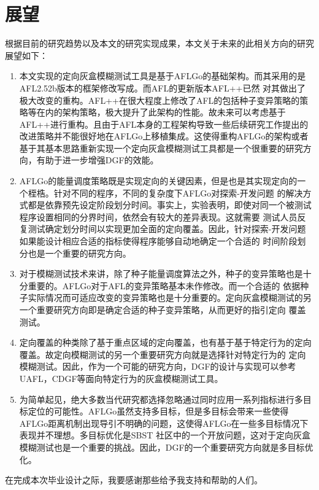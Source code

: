 \documentclass[bachelor]{njupthesis}
\begin{document}
\section{展望}
根据目前的研究趋势以及本文的研究实现成果，本文关于未来的此相关方向的研究展望如下：
\begin{enumerate}[label=(\arabic*),leftmargin=48pt]
	\item 本文实现的定向灰盒模糊测试工具是基于AFLGo的基础架构。而其采用的是AFL2.52b版本的框架修改写成。而AFL的更新版本AFL++已然
	对其做出了极大改变的重构。AFL++在很大程度上修改了AFL的包括种子变异策略的策略等在内的架构策略，极大提升了此架构的性能。故未来可以考虑基于
	AFL++进行重构。且由于AFL本身的工程架构导致一些后续研究工作提出的改进策略并不能很好地在AFLGo上移植集成。这使得重构AFLGo的架构或者
	基于其基本思路重新实现一个定向灰盒模糊测试工具都是一个很重要的研究方向，有助于进一步增强DGF的效能。
	\item AFLGo的能量调度策略既是实现定向的关键因素，但是也是其实现定向的一个桎梏。针对不同的程序，不同的复杂度下AFLGo对探索-开发问题
	的解决方式都是依靠预先设定阶段划分时间。事实上，实验表明，即使对同一个被测试程序设置相同的分界时间，依然会有较大的差异表现。这就需要
	测试人员反复测试确定划分时间以实现更加全面的定向覆盖。因此，针对探索-开发问题如果能设计相应合适的指标使得程序能够自动地确定一个合适的
	时间阶段划分也是一个重要的研究方向。
	\item 对于模糊测试技术来讲，除了种子能量调度算法之外，种子的变异策略也是十分重要的。AFLGo对于AFL的变异策略基本未作修改。而一个合适的
	依据种子实际情况而可适应改变的变异策略也是十分重要的。定向灰盒模糊测试的另一个重要研究方向即是确定合适的种子变异策略，从而更好的指引定向
	覆盖测试。
	\item 定向覆盖的种类除了基于重点区域的定向覆盖，也有基于基于特定行为的定向覆盖。故定向模糊测试的另一个重要研究方向就是选择针对特定行为的
	定向模糊测试。因此，作为一个可能的研究方向，DGF的设计与实现可以参考UAFL，CDGF等面向特定行为的灰盒模糊测试工具。
	\item 为简单起见，绝大多数当代研究都选择忽略通过同时应用一系列指标进行多目标定位的可能性。AFLGo虽然支持多目标，但是多目标会带来一些使得
	AFLGo距离机制出现导引不明确的问题，这使得AFLGo在一些多目标情况下表现并不理想。多目标优化是SBST 社区中的一个开放问题，这对于定向灰盒
	模糊测试也是一个重要的挑战。因此，DGF的一个重要研究方向就是多目标优化。
\end{enumerate}


\thesisacknowledgement
在完成本次毕业设计之际，我要感谢那些给予我支持和帮助的人们。
\end{document}
